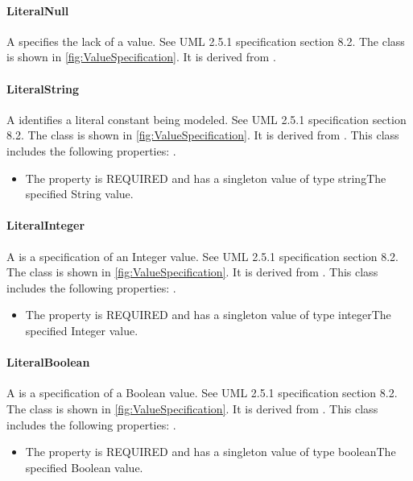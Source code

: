 \paragraph{LiteralNull}%
\label{sec:uml:LiteralNull}%
A  specifies the lack of a value. See UML 2.5.1 specification section 8.2.%
\newline%
\linebreak%
The  class is shown in \ref{fig:ValueSpecification}. It is derived from .%
%
\paragraph{LiteralString}%
\label{sec:uml:LiteralString}%
A  identifies a literal constant being modeled. See UML 2.5.1 specification section 8.2.%
\newline%
\linebreak%
The  class is shown in \ref{fig:ValueSpecification}. It is derived from .%
This class includes the following properties: . %
\begin{itemize}%
\item%
The  property is REQUIRED and has a singleton value of type stringThe specified String value.%
\end{itemize}%
\paragraph{LiteralInteger}%
\label{sec:uml:LiteralInteger}%
A  is a specification of an Integer value. See UML 2.5.1 specification section 8.2.%
\newline%
\linebreak%
The  class is shown in \ref{fig:ValueSpecification}. It is derived from .%
This class includes the following properties: . %
\begin{itemize}%
\item%
The  property is REQUIRED and has a singleton value of type integerThe specified Integer value.%
\end{itemize}%
\paragraph{LiteralBoolean}%
\label{sec:uml:LiteralBoolean}%
A  is a specification of a Boolean value. See UML 2.5.1 specification section 8.2.%
\newline%
\linebreak%
The  class is shown in \ref{fig:ValueSpecification}. It is derived from .%
This class includes the following properties: . %
\begin{itemize}%
\item%
The  property is REQUIRED and has a singleton value of type booleanThe specified Boolean value.%
\end{itemize}%
